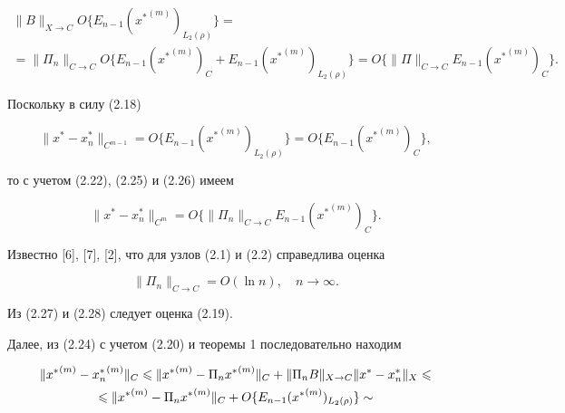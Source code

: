\begin{pf}
\begin{multline}
\|B\|_{X\to C}O\{E_{n-1}({x^*}^{(m)})_{L_2(\rho)}\} = \\


%


=\|\Pi_n\|_{C\to C}O\{E_{n-1}({x^*}^{(m)})_C +


E_{n-1}({x^*}^{(m)})_{L_2(\rho)}\} =


O\{\|\Pi\|_{C\to C} E_{n-1}({x^*}^{(m)})_C\}.


\end{multline}


Поскольку в силу (2.18)


\begin{equation}


\|x^* - x^*_n\|_{C^{m-1}} = O\{E_{n-1}({x^*}^{(m)})_{L_2(\rho)}\} =


O\{E_{n-1}({x^*}^{(m)})_C\},


\end{equation}


то с учетом (2.22), (2.25) и (2.26) имеем


\begin{equation}


\|x^*-x^*_n\|_{C^m} = O\{\|\Pi_n\|_{C\to C}E_{n-1}({x^*}^{(m)})_C\}.


\end{equation}


Известно [6], [7], [2], что для узлов (2.1) и (2.2) справедлива оценка


\begin{equation}


\|\Pi_n\|_{C\to C} = O(\ln n),\quad n\to \infty.


\end{equation}


Из (2.27) и (2.28) следует оценка (2.19).





Далее, из (2.24) с учетом (2.20) и теоремы 1 последовательно находим


\begin{gather*}


\|{x^*}^{(m)} - {x_n^*}^{(m)}\|_C \lea \|{x^*}^{(m)} -


\Pi_n {x^*}^{(m)}\|_C + \|\Pi_n B\|_{X\to C}


\|x^*-x^*_n\|_X \lea \\


%


\lea \|{x^*}^{(m)} - \Pi_n {x^*}^{(m)}\|_C +


O\{E_{n-1}({x^*}^{(m)})_{L_2(\rho)}\} \sim 



\end{gather*}
\end{pf}
